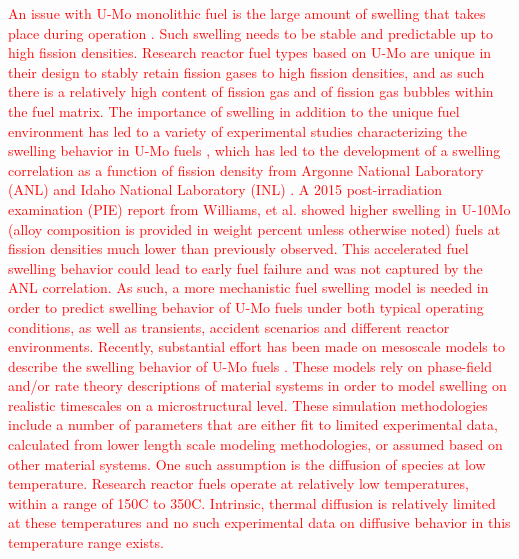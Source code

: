 \documentclass[default]{sn-jnl}%
\begin{document}
\textcolor{red}{
An issue with U-Mo monolithic fuel is the large amount of swelling that takes place during operation \cite{hofman1997}. Such swelling needs to be stable and predictable up to high fission densities. Research reactor fuel types based on U-Mo are unique in their design to stably retain fission gases to high fission densities, and as such there is a relatively high content of fission gas and of fission gas bubbles within the fuel matrix. The importance of swelling in addition to the unique fuel environment has led to a variety of experimental studies characterizing the swelling behavior in U-Mo fuels \cite{rest2009, kim_anl08, meyer2002, kim2013}, which has led to the development of a swelling correlation as a function of fission density from Argonne National Laboratory (ANL) \cite{kim2011} and Idaho National Laboratory (INL) \cite{umo_prelim_report2017}. A 2015 post-irradiation examination (PIE) report \cite{afip6report} from Williams, et al. showed higher swelling in U-10Mo (alloy composition is provided in weight percent unless otherwise noted) fuels at fission densities much lower than previously observed. This accelerated fuel swelling behavior could lead to early fuel failure and was not captured by the ANL correlation. As such, a more mechanistic fuel swelling model is needed in order to predict swelling behavior of U-Mo fuels under both typical operating conditions, as well as transients, accident scenarios and different reactor environments.
Recently, substantial effort has been made on mesoscale models to describe the swelling behavior of U-Mo fuels \cite{liang2018, liang2018a, liang2017, liang2016, ye2018, hu2017a, hu2016, hu2016a}. These models rely on phase-field and/or rate theory descriptions of material systems in order to model swelling on realistic timescales on a microstructural level. These simulation methodologies include a number of parameters that are either fit to limited experimental data, calculated from lower length scale modeling methodologies, or assumed based on other material systems. One such assumption is the diffusion of species at low temperature. Research reactor fuels operate at relatively low temperatures, within a range of 150\textdegree C to 350\textdegree C. Intrinsic, thermal diffusion is relatively limited at these temperatures and no such experimental data on diffusive behavior in this temperature range exists. 
}
\end{document}
